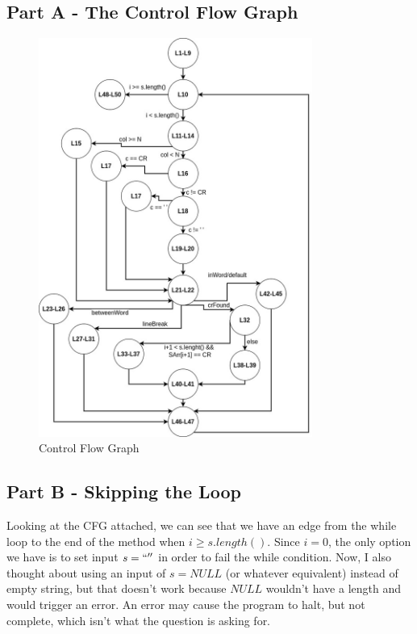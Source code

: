 \documentclass{article}
\begin{document}
\subsection*{Part A - The Control Flow Graph}

\begin{figure}[htbp]
    \centering
    \includegraphics[width=0.8\textwidth]{./img/3S03-A2-Q3-P1.jpg}
    \caption{Control Flow Graph}
    \label{fig:CFG}
\end{figure}

\subsection*{Part B - Skipping the Loop}

Looking at the CFG attached, we can see that we have an edge from the while loop to the end of the method when $i \ge s.length()$. Since $i = 0$, the only option we have is to set input $s = ``''$ in order to fail the while condition. Now, I also thought about using an input of $s = NULL$ (or whatever equivalent) instead of empty string, but that doesn't work because $NULL$ wouldn't have a length and would trigger an error. An error may cause the program to halt, but not complete, which isn't what the question is asking for.
\end{document}
